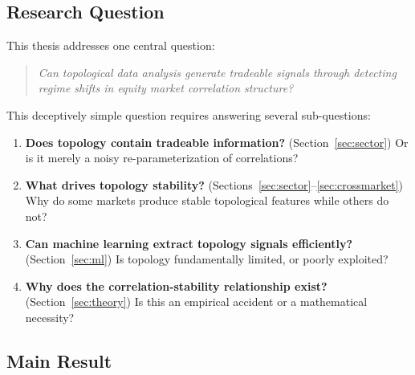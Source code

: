 \documentclass[12pt,letterpaper]{article}
\begin{document}
\subsection{Research Question}

This thesis addresses one central question:

\begin{quote}
\textit{Can topological data analysis generate tradeable signals through detecting regime shifts in equity market correlation structure?}
\end{quote}

This deceptively simple question requires answering several sub-questions:

\begin{enumerate}[label=\arabic*.]
    \item \textbf{Does topology contain tradeable information?} (Section~\ref{sec:sector}) Or is it merely a noisy re-parameterization of correlations?

    \item \textbf{What drives topology stability?} (Sections~\ref{sec:sector}--\ref{sec:crossmarket}) Why do some markets produce stable topological features while others do not?

    \item \textbf{Can machine learning extract topology signals efficiently?} (Section~\ref{sec:ml}) Is topology fundamentally limited, or poorly exploited?

    \item \textbf{Why does the correlation-stability relationship exist?} (Section~\ref{sec:theory}) Is this an empirical accident or a mathematical necessity?
\end{enumerate}

\subsection{Main Result}
\end{document}
